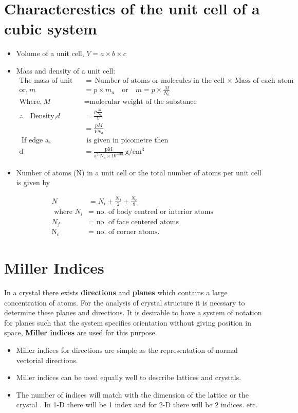 \section{Characterestics of the unit cell of a cubic system}
\begin{itemize}
	\item  Volume of a unit cell, $V=a \times b \times c$
	\item Mass and density of a unit cell:
	\begin{align*}
	\text{The mass of unit cell} &= \text{Number of atoms or molecules in the cell $\times$ Mass of each atom}\\
	\text{or,}\ m&=p \times m_{a}\quad \text{or}\quad  m=p \times \frac{M}{N_{a}} \\
	\text{Where,}\ M&= \text{molecular weight of the substance}\\
	\therefore \quad \text{Density,} d&=\frac{p \frac{M}{N_{a}}}{V}\\&=\frac{p M}{V N_{a}}\\
	\text{	If edge $\mathrm{a}$,}&\text{ is given in picometre then}\\
	\mathrm{d}&=\frac{\mathrm{pM}}{\mathrm{a}^{3} \mathrm{~N}_{\mathrm{a}} \times 10^{-30}} \mathrm{~g} / \mathrm{cm}^{3}
	\end{align*}
	\item Number of atoms (N) in a unit cell or the total number of atoms per unit cell is given by 
\end{itemize}
\begin{align*}
N&=N_{i}+\frac{N_{f}}{2}+\frac{N_{c}}{8}\\
\text{ where $N_{i}$}&=\text{ no. of body centred or interior atoms }\\
N_{f}&=\text{ no. of face centered atoms}\\ 
\mathrm{N}_{\mathrm{c}}&=\text{ no. of corner atoms.}
\end{align*}



\section {Miller Indices}
In a crystal there exists \textbf{directions} and \textbf{planes} which contains a large concentration of atoms. For the analysis of crystal structure it is necssary to determine these planes and directions.
It is desirable to have a system of notation for planes such that the system specifies orientation without giving position in space, \textbf{Miller indices} are used for this purpose.
\begin{itemize}
	\item Miller indices for directions are simple as the representation of normal vectorial directions.
	\item Miller indices can be used equally well to describe lattices and crystals.
	\item The number of indices will match with the dimension of the lattice or the crystal . In 1-D there will be 1 index and for 2-D there will be 2 indices. etc.
\end{itemize}
